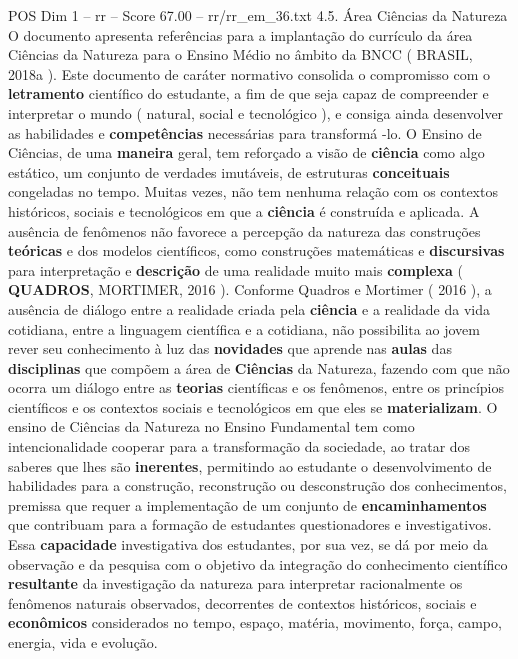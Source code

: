 \begin{textsample}{POS Dim 1 – rr – Score 67.00 – rr/rr\_em\_36.txt}  \label{ex:f1_pos_211}
4.5.
Área Ciências da Natureza O documento apresenta referências para a implantação do currículo da área Ciências da Natureza para o Ensino Médio no âmbito da BNCC ( BRASIL, 2018a ).
Este documento de caráter normativo consolida o compromisso com o \textbf{letramento} científico do estudante, a fim de que seja capaz de compreender e interpretar o mundo ( natural, social e tecnológico ), e consiga ainda desenvolver as habilidades e \textbf{competências} necessárias para transformá -lo.
O Ensino de Ciências, de uma \textbf{maneira} geral, tem reforçado a visão de \textbf{ciência} como algo estático, um conjunto de verdades imutáveis, de estruturas \textbf{conceituais} congeladas no tempo.
Muitas vezes, não tem nenhuma relação com os contextos históricos, sociais e tecnológicos em que a \textbf{ciência} é construída e aplicada.
A ausência de fenômenos não favorece a percepção da natureza das construções \textbf{teóricas} e dos modelos científicos, como construções matemáticas e \textbf{discursivas} para interpretação e \textbf{descrição} de uma realidade muito mais \textbf{complexa} ( \textbf{QUADROS}, MORTIMER, 2016 ).
Conforme Quadros e Mortimer ( 2016 ), a ausência de diálogo entre a realidade criada pela \textbf{ciência} e a realidade da vida cotidiana, entre a linguagem científica e a cotidiana, não possibilita ao jovem rever seu conhecimento à luz das \textbf{novidades} que aprende nas \textbf{aulas} das \textbf{disciplinas} que compõem a área de \textbf{Ciências} da Natureza, fazendo com que não ocorra um diálogo entre as \textbf{teorias} científicas e os fenômenos, entre os princípios científicos e os contextos sociais e tecnológicos em que eles se \textbf{materializam}.
O ensino de Ciências da Natureza no Ensino Fundamental tem como intencionalidade cooperar para a transformação da sociedade, ao tratar dos saberes que lhes são \textbf{inerentes}, permitindo ao estudante o desenvolvimento de habilidades para a construção, reconstrução ou desconstrução dos conhecimentos, premissa que requer a implementação de um conjunto de \textbf{encaminhamentos} que contribuam para a formação de estudantes questionadores e investigativos.
Essa \textbf{capacidade} investigativa dos estudantes, por sua vez, se dá por meio da observação e da pesquisa com o objetivo da integração do conhecimento científico \textbf{resultante} da investigação da natureza para interpretar racionalmente os fenômenos naturais observados, decorrentes de contextos históricos, sociais e \textbf{econômicos} considerados no tempo, espaço, matéria, movimento, força, campo, energia, vida e evolução.

\end{textsample}
